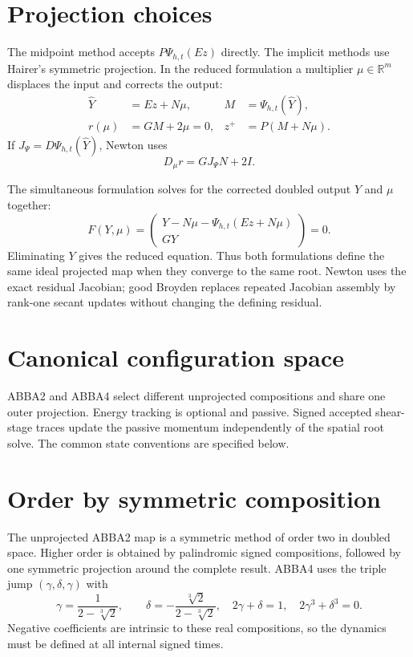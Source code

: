 \documentclass[11pt,a4paper]{article}
\newcommand{\R}{\mathbb{R}}
\begin{document}
\section{Projection choices}

The midpoint method accepts $P\Psi_{h,t}(Ez)$ directly.  The implicit methods
use Hairer's symmetric projection.  In the reduced formulation a multiplier
$\mu\in\R^m$ displaces the input and corrects the output:
\begin{align}
 \widehat Y &= Ez+N\mu, & M&=\Psi_{h,t}(\widehat Y),\\
 r(\mu)&=GM+2\mu=0, & z^+&=P(M+N\mu).
\end{align}
If $J_\Psi=D\Psi_{h,t}(\widehat Y)$, Newton uses
\[
 D_\mu r=GJ_\Psi N+2I.
\]

The simultaneous formulation solves for the corrected doubled output $Y$ and
$\mu$ together:
\[
 F(Y,\mu)=
 \begin{pmatrix}
 Y-N\mu-\Psi_{h,t}(Ez+N\mu)\\GY
 \end{pmatrix}=0.
\]
Eliminating $Y$ gives the reduced equation.  Thus both formulations define
the same ideal projected map when they converge to the same root.  Newton uses
the exact residual Jacobian; good Broyden replaces repeated Jacobian assembly
by rank-one secant updates without changing the defining residual.

\section{Canonical configuration space}
ABBA2 and ABBA4 select different unprojected compositions and share one outer projection. Energy tracking is optional and passive.
Signed accepted shear-stage traces update the passive momentum independently of the spatial root solve.
The common state conventions are specified below.

\section{Order by symmetric composition}

The unprojected ABBA2 map is a symmetric method of order two in doubled
space. Higher order is obtained by palindromic signed compositions, followed
by one symmetric projection around the complete result.  ABBA4 uses the triple jump
$(\gamma,\delta,\gamma)$ with
\[
 \gamma=\frac{1}{2-\sqrt[3]{2}},\qquad
 \delta=-\frac{\sqrt[3]{2}}{2-\sqrt[3]{2}},
 \quad 2\gamma+\delta=1,\quad 2\gamma^3+\delta^3=0.
\]
Negative coefficients are intrinsic
to these real compositions, so the dynamics must be defined at all internal
signed times.
\end{document}

